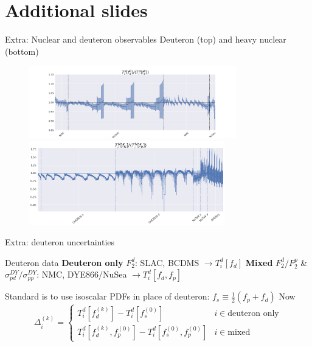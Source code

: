 \documentclass{beamer}
\begin{document}
\section{Additional slides}

\begin{frame}{Extra: Nuclear and deuteron observables}
\footnotesize{Deuteron (top) and heavy nuclear (bottom) }
  \begin{figure}
    \includegraphics[width=90mm, trim={30mm, 0, 30mm, 0}]{nuclear_uncs/obsdeut.png}
    \includegraphics[width=85mm]{nuclear_uncs/obsnuc.png}
  \end{figure}
\end{frame}

\begin{frame}{Extra: deuteron uncertainties}

\begin{block}{Deuteron data}
{\bf Deuteron only} $F_2^d$: SLAC, BCDMS  $\to T_i^d[f_d]$
\newline
{\bf Mixed} $F_2^d/F_2^p$ \& $\sigma_{pd}^{DY}/\sigma_{pp}^{DY}$: NMC, DYE866/NuSea  $ \to T_i^d[f_d, f_p]$
\end{block}
Standard is to use isoscalar PDFs in place of deuteron: $f_s \equiv \frac{1}{2}(f_p + f_d)$
Now 
\begin{equation}
\Delta_i^{(k)} = \begin{cases}
T_i^d[f_d^{(k)}] - T_i^d[f_s^{(0)}] & i \in \text{deuteron only}\\
T_i^d[f_d^{(k)}, f_p^{(0)}] - T_i^d[f_s^{(0)}, f_p^{(0)}] & i \in \text{mixed}
\end{cases}
\end{equation}
\end{frame}
\end{document}
